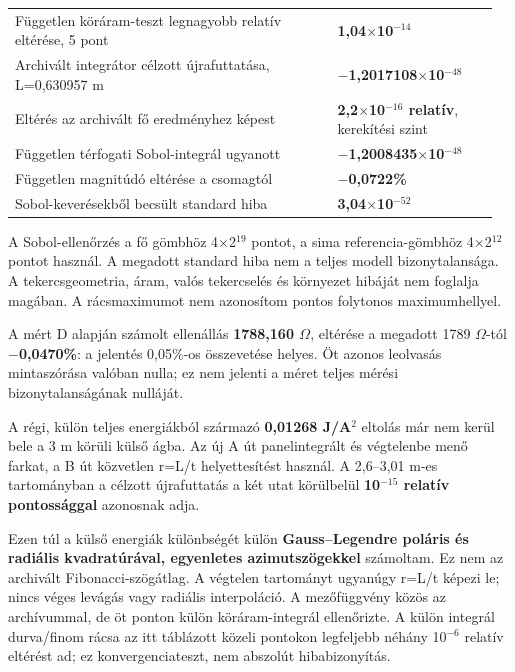 \documentclass[10pt,a4paper]{article}
\begin{document}
{\begin{center}
{\begin{tabular}{@{}>{\raggedright\arraybackslash}p{0.64\linewidth}>{\raggedleft\arraybackslash}p{0.32\linewidth}@{}}
Független köráram-teszt legnagyobb relatív eltérése, 5 pont & \textbf{1,04$\times$10$^{-14}$} \\
Archivált integrátor célzott újrafuttatása, L=0,630957 m & \textbf{$-$1,2017108$\times$10$^{-48}$} \\
Eltérés az archivált fő eredményhez képest & \textbf{2,2$\times$10$^{-16}$ relatív}, kerekítési szint \\
Független térfogati Sobol-integrál ugyanott & \textbf{$-$1,2008435$\times$10$^{-48}$} \\
Független magnitúdó eltérése a csomagtól & \textbf{$-$0,0722\%} \\
Sobol-keverésekből becsült standard hiba & \textbf{3,04$\times$10$^{-52}$} \\
\bottomrule\end{tabular}}\vspace{-2pt}\end{center}
\par
A Sobol-ellenőrzés a fő gömbhöz 4$\times$2$^{19}$ pontot, a sima referencia-gömbhöz 4$\times$2$^{12}$ pontot használ. A megadott standard hiba nem a teljes modell bizonytalansága. A tekercsgeometria, áram, valós tekercselés és környezet hibáját nem foglalja magában. A rácsmaximumot nem azonosítom pontos folytonos maximumhellyel.
\par
A mért D alapján számolt ellenállás \textbf{1788,160 $\Omega$}, eltérése a megadott 1789 $\Omega$-tól \textbf{$-$0,0470\%}: a jelentés 0,05\%-os összevetése helyes. Öt azonos leolvasás mintaszórása valóban nulla; ez nem jelenti a méret teljes mérési bizonytalanságának nulláját.
\par
\vspace{2pt}\par\vspace{0.5pt}
\par
A régi, külön teljes energiákból származó \textbf{0,01268 J/A$^2$} eltolás már nem kerül bele a 3 m körüli külső ágba. Az új A út panelintegrált és végtelenbe menő farkat, a B út közvetlen r=L/t helyettesítést használ. A 2,6--3,01 m-es tartományban a célzott újrafuttatás a két utat körülbelül \textbf{10$^{-15}$ relatív pontossággal} azonosnak adja.
\par
Ezen túl a külső energiák különbségét külön \textbf{Gauss--Legendre poláris és radiális kvadratúrával, egyenletes azimutszögekkel} számoltam. Ez nem az archivált Fibonacci-szögátlag. A végtelen tartományt ugyanúgy r=L/t képezi le; nincs véges levágás vagy radiális interpoláció. A mezőfüggvény közös az archívummal, de öt ponton külön köráram-integrál ellenőrizte. A külön integrál durva/finom rácsa az itt táblázott közeli pontokon legfeljebb néhány 10$^{-6}$ relatív eltérést ad; ez konvergenciateszt, nem abszolút hibabizonyítás.
}
\end{document}

